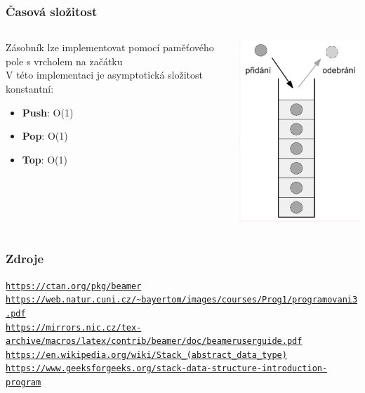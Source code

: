 \documentclass[mode=present, paper=A4paper, orien=landscape, style=default]{beamer}
\begin{document}
\begin{frame}
	\frametitle{Časová složitost}
	\begin{columns}
		\begin{column}{0.6\textwidth}
		Zásobník lze implementovat pomocí paměťového pole s vrcholem na začátku\\
		\smallskip
		V této implementaci je asymptotická složitost konstantní:
			 \begin{itemize}
			    	\item \textbf{Push}: O(1)
				\item \textbf{Pop}: O(1)	
				\item \textbf{Top}: O(1)
			\end{itemize}
		\end{column}
		\begin{column}{0.4\textwidth}		
			\includegraphics[scale = 0.6]{stack}
		\end{column}
	\end{columns}
\end{frame}


\begin{frame}
    	\frametitle{Zdroje}
    	\texttt{\url{https://ctan.org/pkg/beamer}}\\
    	\texttt{\url{https://web.natur.cuni.cz/~bayertom/images/courses/Prog1/programovani3.pdf}}\\
	\texttt{\url{https://mirrors.nic.cz/tex-archive/macros/latex/contrib/beamer/doc/beameruserguide.pdf}}\\
	\texttt{\url{https://en.wikipedia.org/wiki/Stack_(abstract_data_type)}}\\
	\texttt{\url{https://www.geeksforgeeks.org/stack-data-structure-introduction-program}}\\
\end{frame}
\end{document}
